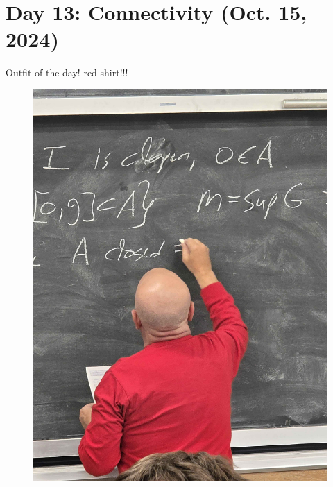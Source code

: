 \section{Day 13: Connectivity (Oct. 15, 2024)}
Outfit of the day! red shirt!!!
\begin{figure}[h]
    \centering
    \includegraphics[scale=0.1]{MAT327 Notes/Dror Shirts/dror day 13 shirt.jpg}
\end{figure}

